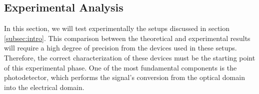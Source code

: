 \subsection{Experimental Analysis}
%
In this section, we will test experimentally the setups discussed in section \ref{subsec:intro}.
%
This comparison between the theoretical and experimental results will require a high degree of precision from the devices used in these setups. Therefore, the correct characterization of these devices must be the starting point of this experimental phase.
One of the most fundamental components is the photodetector, which performs the signal's conversion from the optical domain into the electrical domain.
%
